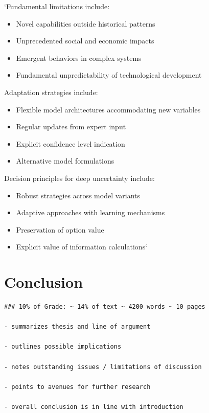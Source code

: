 \documentclass[]{book}
\providecommand{\tightlist}{%
  \setlength{\itemsep}{0pt}\setlength{\parskip}{0pt}}
\begin{document}
`Fundamental limitations include:

\begin{itemize}
\tightlist
\item
  Novel capabilities outside historical patterns
\item
  Unprecedented social and economic impacts
\item
  Emergent behaviors in complex systems
\item
  Fundamental unpredictability of technological development
\end{itemize}

Adaptation strategies include:

\begin{itemize}
\tightlist
\item
  Flexible model architectures accommodating new variables
\item
  Regular updates from expert input
\item
  Explicit confidence level indication
\item
  Alternative model formulations
\end{itemize}

Decision principles for deep uncertainty include:

\begin{itemize}
\tightlist
\item
  Robust strategies across model variants
\item
  Adaptive approaches with learning mechanisms
\item
  Preservation of option value
\item
  Explicit value of information calculations`
\end{itemize}


\chapter{Conclusion}\label{conclusion}

\begin{verbatim}
### 10% of Grade: ~ 14% of text ~ 4200 words ~ 10 pages

- summarizes thesis and line of argument

- outlines possible implications

- notes outstanding issues / limitations of discussion

- points to avenues for further research

- overall conclusion is in line with introduction
\end{verbatim}
\end{document}
